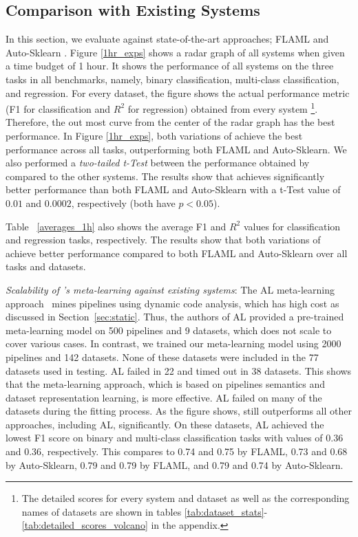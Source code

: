 \subsection{Comparison with Existing Systems}
\label{baselines_comparison}



In this section, we evaluate {\sysname} against state-of-the-art approaches; FLAML \cite{flaml} and Auto-Sklearn \cite{autosklearn}. Figure \ref{1hr_exps} shows a radar graph of all systems when given a time budget of 1 hour. It shows the performance of all systems on the three tasks in all benchmarks, namely, binary classification, multi-class classification, and regression. For every dataset, the figure shows  the actual performance metric (F1 for classification and $R^2$ for regression) obtained from every system
 \footnote{The detailed scores for every system and dataset as well as the corresponding names of datasets are shown in tables \ref{tab:dataset_stats}-\ref{tab:detailed_scores_volcano} in the appendix.}. 
Therefore, the out most curve from the center of the radar graph has the best performance. In Figure \ref{1hr_exps}, both variations of {\sysname} achieve the best performance across all tasks, outperforming both FLAML and Auto-Sklearn. We also performed a \textit{two-tailed t-Test} between the performance obtained by {\sysname} compared to the other systems. The results show that {\sysname} achieves  significantly better performance than both FLAML and Auto-Sklearn with a t-Test value of $0.01$ and $0.0002$, respectively (both have $p < 0.05$). 





Table ~\ref{averages_1h} also shows the average F1 and $R^2$ values for classification and regression tasks, respectively. The results show that both variations of {\sysname} achieve better performance compared to both FLAML and Auto-Sklearn over all tasks and datasets. 

\textit{Scalability of {\sysname}'s meta-learning against existing systems}: 
The AL meta-learning approach~\cite{al} mines pipelines using dynamic code analysis, which has high cost as discussed in Section~\ref{sec:static}. Thus, the authors of AL provided a pre-trained meta-learning model on 500 pipelines and 9 datasets, which does not scale to cover various cases. In contrast, we trained our meta-learning model using 2000 pipelines and 142 datasets. None of these datasets were included in the 77 datasets used in testing. AL failed in 22 and timed out in 38 datasets. This shows that the {\sysname} meta-learning approach, which is based on pipelines semantics and dataset representation learning, is more effective.
AL failed on many of the datasets during the fitting process. As the figure shows, {\sysname} still outperforms all other approaches, including AL, significantly. On these datasets, AL achieved the lowest F1 score on binary and multi-class classification tasks with values of 0.36 and 0.36, respectively. This compares to 0.74 and 0.75 by FLAML, 0.73 and 0.68 by Auto-Sklearn,  0.79 and  0.79 by {\sysname FLAML}, and 0.79 and 0.74 by {\sysname Auto-Sklearn}. 




